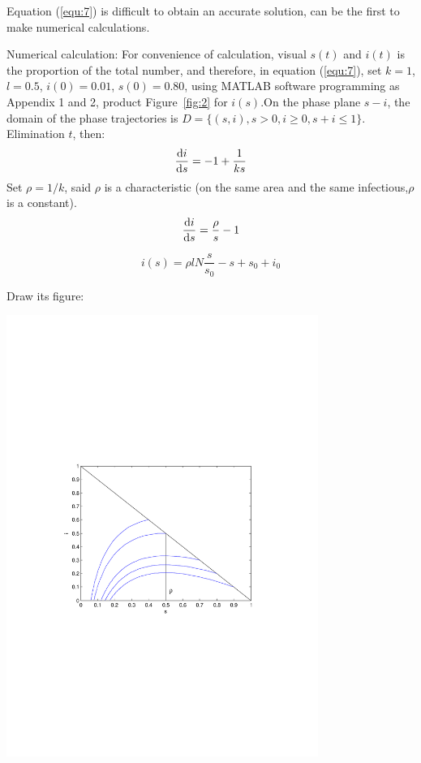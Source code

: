 Equation (\ref{equ:7}) is difficult to obtain an accurate
solution, can be the first to make numerical calculations.
\par Numerical calculation: For convenience of calculation, visual
$ s(t) $ and $ i(t) $ is the proportion of the total number,
and therefore, in equation (\ref{equ:7}), set $k=1$,
$l=0.5$, $i(0)=0.01$, $s(0)=0.80$, using MATLAB software
programming as Appendix 1 and 2, product Figure~\ref{fig:2} for
$i(s)$.On the phase plane $s-i$, the domain of the phase
trajectories is $ D=\{(s,i),s>0,i\geq 0,s+i\leq1\} $.\\
Elimination $ t $, then:
\begin{equation}
\frac{{\mathrm{d}}i}{{\mathrm{d}}s}=-1+\frac{1}{ks}
\label{equ:8}
\end{equation}
Set $\rho=1/k$, said $\rho$ is a characteristic (on the
same area and the same infectious,$\rho$ is a
constant)\cite{bib2}.
\begin{equation}
\frac{{\mathrm{d}}i}{{\mathrm{d}}s}=\frac{\rho}{s}-1
\label{equ:9}
\end{equation}

\begin{equation}
i(s)=\rho lN\frac{s}{s_0}-s+s_0+i_0
\label{equ:10}
\end{equation}

Draw its figure:\par
\begin{center}
\includegraphics[width=4in]{imgs/i(s)_i_s.pdf}
\end{center}

